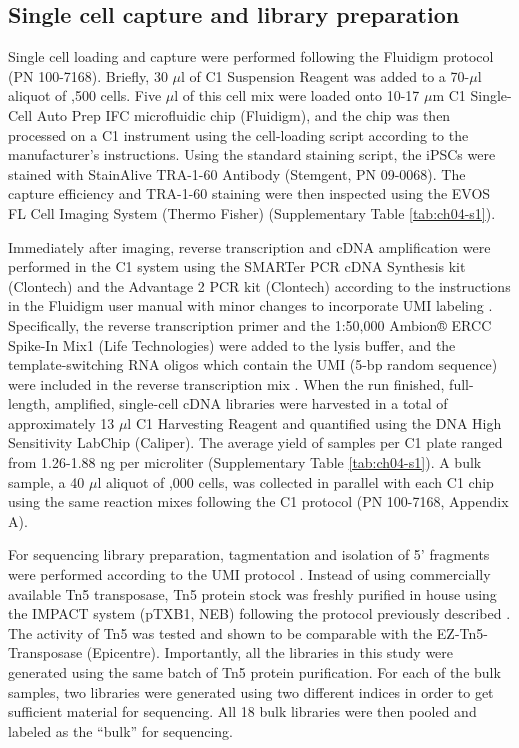 \subsection{Single cell capture and library
preparation}\label{single-cell-capture-and-library-preparation}

Single cell loading and capture were performed following the Fluidigm
protocol (PN 100-7168). Briefly, 30 $\mu$l of C1 Suspension Reagent
was added to a 70-$\mu$l aliquot of ,500 cells. Five $\mu$l
of this cell mix were loaded onto 10-17 $\mu$m C1 Single-Cell Auto
Prep IFC microfluidic chip (Fluidigm), and the chip was then processed
on a C1 instrument using the cell-loading script according to the
manufacturer's instructions. Using the standard staining script, the
iPSCs were stained with StainAlive TRA-1-60 Antibody (Stemgent, PN
09-0068). The capture efficiency and TRA-1-60 staining were then
inspected using the EVOS FL Cell Imaging System (Thermo Fisher)
(Supplementary Table \ref{tab:ch04-s1}).

Immediately after imaging, reverse transcription and cDNA
amplification were performed in the C1 system using the SMARTer PCR
cDNA Synthesis kit (Clontech) and the Advantage 2 PCR kit (Clontech)
according to the instructions in the Fluidigm user manual with minor
changes to incorporate UMI labeling \citep{Islam2014}. Specifically,
the reverse transcription primer and the 1:50,000 Ambion® ERCC
Spike-In Mix1 (Life Technologies) were added to the lysis buffer, and
the template-switching RNA oligos which contain the UMI (5-bp random
sequence) were included in the reverse transcription mix
\citep{Islam2011, Islam2012, Islam2014}.  When the run finished,
full-length, amplified, single-cell cDNA libraries were harvested in a
total of approximately 13 $\mu$l C1 Harvesting Reagent and quantified
using the DNA High Sensitivity LabChip (Caliper). The average yield of
samples per C1 plate ranged from 1.26-1.88 ng per microliter
(Supplementary Table \ref{tab:ch04-s1}). A bulk sample, a 40 $\mu$l
aliquot of ,000 cells, was collected in parallel with each
C1 chip using the same reaction mixes following the C1 protocol (PN
100-7168, Appendix A).

For sequencing library preparation, tagmentation and isolation of 5'
fragments were performed according to the UMI protocol
\citep{Islam2014}.  Instead of using commercially available Tn5
transposase, Tn5 protein stock was freshly purified in house using the
IMPACT system (pTXB1, NEB) following the protocol previously described
\citep{Picelli2014}. The activity of Tn5 was tested and shown to be
comparable with the EZ-Tn5-Transposase (Epicentre). Importantly, all
the libraries in this study were generated using the same batch of Tn5
protein purification.  For each of the bulk samples, two libraries
were generated using two different indices in order to get sufficient
material for sequencing.  All 18 bulk libraries were then pooled and
labeled as the ``bulk'' for sequencing.

